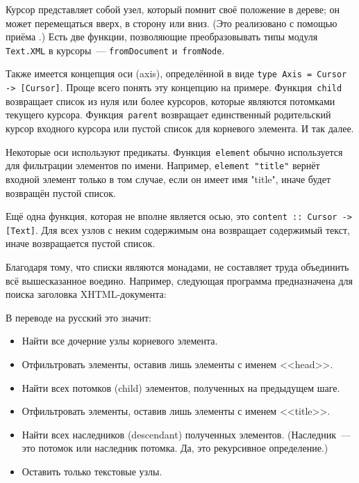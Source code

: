 Курсор представляет собой узел, который помнит своё положение в дереве; он
может перемещаться вверх, в сторону или вниз. (Это реализовано с помощью приёма
.) Есть две функции, позволяющие преобразовывать типы модуля
\lstinline!Text.XML! в курсоры~--- \lstinline!fromDocument!
и~\lstinline!fromNode!.

Также имеется концепция оси (axis), определённой в виде
\lstinline!type Axis = Cursor -> [Cursor]!.
Проще всего понять эту концепцию на примере.
Функция~\lstinline'child' возвращает список из нуля или более курсоров, которые
являются потомками текущего курсора. Функция~\lstinline'parent' возвращает
единственный родительский курсор входного курсора или пустой список для
корневого элемента. И так далее.

Некоторые оси используют предикаты. Функция~\lstinline!element! обычно
используется для фильтрации элементов по имени. Например, \lstinline!element "title"!
вернёт входной элемент только в том случае, если он имеет имя "title",
иначе будет возвращён пустой список.

Ещё одна функция, которая не вполне является осью, это
\lstinline!content :: Cursor -> [Text]!.
Для всех узлов с неким содержимым она возвращает содержимый текст, иначе
возвращается пустой список.

Благодаря тому, что списки являются монадами, не составляет труда объединить
всё вышесказанное воедино. Например, следующая программа предназначена для
поиска заголовка XHTML-документа:


В переводе на русский это значит:
\begin{itemize}
    \item Найти все дочерние узлы корневого элемента.

    \item Отфильтровать элементы, оставив лишь элементы с именем <<head>>.

    \item Найти всех потомков (child) элементов, полученных на предыдущем шаге.

    \item Отфильтровать элементы, оставив лишь элементы с именем <<title>>.

    \item Найти всех наследников (descendant) полученных элементов.
        (Наследник~--- это потомок или наследник потомка. Да, это рекурсивное
        определение.)

    \item Оставить только текстовые узлы.
\end{itemize}

